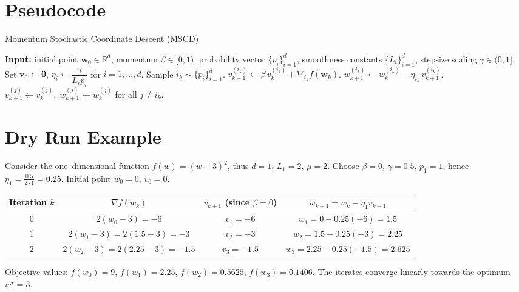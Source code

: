 \documentclass{article}
\newcommand{\R}{\mathbb{R}}
\begin{document}
\section*{Pseudocode}
\begin{algorithm}[H]
\caption{Momentum Stochastic Coordinate Descent (MSCD)}
\begin{algorithmic}[1]
\STATE \textbf{Input:} initial point $\bm w_0\in\R^{d}$, momentum $\beta\in[0,1)$,
probability vector $\{p_i\}_{i=1}^{d}$, smoothness constants $\{L_i\}_{i=1}^{d}$,
stepsize scaling $\gamma\in(0,1]$.
\STATE Set $\bm v_0\gets\bm 0$, $\eta_i\gets \dfrac{\gamma}{L_i p_i}$ for $i=1,\dots ,d$.
    \STATE Sample $i_k\sim\{p_i\}_{i=1}^{d}$.
    \STATE $v_{k+1}^{(i_k)} \gets \beta\,v_{k}^{(i_k)}+\nabla_{i_k} f(\bm w_k)$.
    \STATE $w_{k+1}^{(i_k)} \gets w_{k}^{(i_k)}-\eta_{i_k}\,v_{k+1}^{(i_k)}$.
    \STATE $v_{k+1}^{(j)}\gets v_{k}^{(j)},\; w_{k+1}^{(j)}\gets w_{k}^{(j)}$ for all $j\neq i_k$.
\ENDFOR
\end{algorithmic}
\end{algorithm}

\section*{Dry Run Example}
Consider the one–dimensional function $f(w)=(w-3)^{2}$, thus $d=1$, $L_{1}=2$, $\mu=2$.
Choose $\beta=0$, $\gamma=0.5$, $p_{1}=1$, hence $\eta_{1}= \frac{0.5}{2\cdot 1}=0.25$.
Initial point $w_{0}=0$, $v_{0}=0$.

\begin{center}
\begin{tabular}{c|c|c|c}
Iteration $k$ & $\nabla f(w_k)$ & $v_{k+1}$ (since $\beta=0$) & $w_{k+1}=w_k-\eta_1 v_{k+1}$\\ \hline
0 & $2(w_0-3)=-6$ & $v_{1}=-6$ & $w_{1}=0-0.25(-6)=1.5$\\
1 & $2(w_1-3)=2(1.5-3)=-3$ & $v_{2}=-3$ & $w_{2}=1.5-0.25(-3)=2.25$\\
2 & $2(w_2-3)=2(2.25-3)=-1.5$ & $v_{3}=-1.5$ & $w_{3}=2.25-0.25(-1.5)=2.625$
\end{tabular}
\end{center}
Objective values: $f(w_0)=9$, $f(w_1)=2.25$, $f(w_2)=0.5625$, $f(w_3)=0.1406$.  
The iterates converge linearly towards the optimum $w^{\star}=3$.

\newpage
\end{document}
